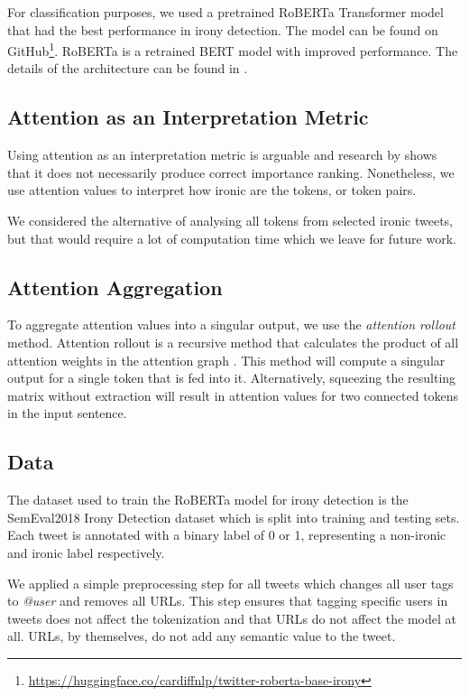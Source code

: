 \documentclass[10pt, a4paper]{article}
\begin{document}
For classification purposes, we used a pretrained RoBERTa Transformer model that had the best performance in irony detection.
The model can be found on GitHub\footnote{\url{https://huggingface.co/cardiffnlp/twitter-roberta-base-irony}}.
RoBERTa is a retrained BERT model with improved performance. The details of the architecture can be found in \citep{roberta}. 

\subsection{Attention as an Interpretation Metric}

Using attention as an interpretation metric is arguable and research by \citet{attention-interpretable} shows that it does not necessarily produce correct importance ranking.
Nonetheless, we use attention values to interpret how ironic are the tokens, or token pairs.

We considered the alternative of analysing all tokens from selected ironic tweets, but that would require a lot of computation time which we leave for future work.

\subsection{Attention Aggregation}
\label{sec:attaggr}

To aggregate attention values into a singular output, we use the \textit{attention rollout} method.
Attention rollout is a recursive method that calculates the product of all attention weights in the attention graph \citep{quantifying-attention-flow}.
This method will compute a singular output for a single token that is fed into it.
Alternatively, squeezing the resulting matrix without extraction will result in attention values for two connected tokens in the input sentence.

\subsection{Data}

The dataset used to train the RoBERTa model for irony detection is the SemEval2018 Irony Detection dataset \citep{van-hee-etal-2018-semeval} which is split into training and testing sets.
Each tweet is annotated with a binary label of 0 or 1, representing a non-ironic and ironic label respectively.

We applied a simple preprocessing step for all tweets which changes all user tags to \textit{@user} and removes all URLs.
This step ensures that tagging specific users in tweets does not affect the tokenization and that URLs do not affect the model at all.
URLs, by themselves, do not add any semantic value to the tweet.
\end{document}
